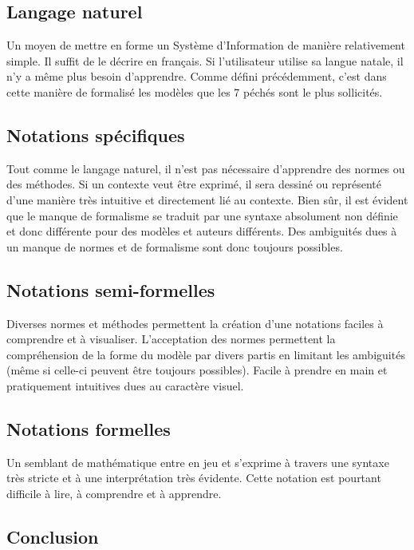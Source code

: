 \subsection{Langage naturel}

Un moyen de mettre en forme un Système d'Information de manière relativement simple. Il suffit de le décrire en français. Si l'utilisateur utilise sa langue natale, il n'y a même plus besoin d'apprendre. Comme défini précédemment, c'est dans cette manière de formalisé les modèles que les 7 péchés sont le plus sollicités.

\subsection{Notations spécifiques}

Tout comme le langage naturel, il n'est pas nécessaire d'apprendre des normes ou des méthodes. Si un contexte veut être exprimé, il sera dessiné ou représenté d'une manière très intuitive et directement lié au contexte. Bien sûr, il est évident que le manque de formalisme se traduit par une syntaxe absolument non définie et donc différente pour des modèles et auteurs différents. Des ambiguités dues à un manque de normes et de formalisme sont donc toujours possibles.

\subsection{Notations semi-formelles}

Diverses normes et méthodes permettent la création d'une notations faciles à comprendre et à visualiser. L'acceptation des normes permettent la compréhension de la forme du modèle par divers partis en limitant les ambiguités (même si celle-ci peuvent être toujours possibles). Facile à prendre en main et pratiquement intuitives dues au caractère visuel.

\subsection{Notations formelles}

Un semblant de mathématique entre en jeu et s'exprime à travers une syntaxe très stricte et à une interprétation très évidente. Cette notation est pourtant difficile à lire, à comprendre et à apprendre.

\subsection{Conclusion}


